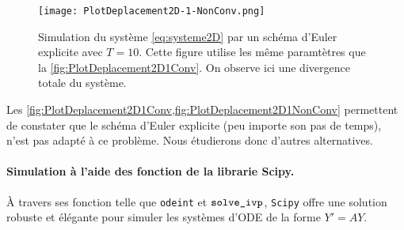 \begin{figure}[!h]
    \centering
    \texttt{[image: PlotDeplacement2D-1-NonConv.png]}
    \caption{Simulation du système \ref{eq:systeme2D} par un schéma d'Euler explicite avec $T = 10$. Cette figure utilise les même paramtètres que la \cref{fig:PlotDeplacement2D1Conv}. On observe ici une divergence totale du système.}
    \label{fig:PlotDeplacement2D1NonConv}
\end{figure}

Les \cref{fig:PlotDeplacement2D1Conv,fig:PlotDeplacement2D1NonConv} permettent de constater que le schéma d'Euler explicite (peu importe son pas de temps), n'est pas adapté à ce problème. Nous étudierons donc d'autres alternatives. 

 
\paragraph{Simulation à l'aide des fonction de la librarie Scipy.} À travers ses fonction telle que \texttt{odeint} et $\verb|solve_ivp|$, \texttt{Scipy} offre une solution robuste et élégante pour simuler les systèmes d'ODE de la forme $Y' = AY$.


 







